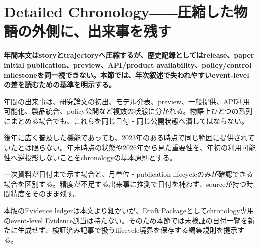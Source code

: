 \section{Detailed Chronology――圧縮した物語の外側に、出来事を残す}
\label{pkg:annual-chronology}
\noindent\textbf{年間本文はstoryとtrajectoryへ圧縮するが、歴史記録としてはrelease、paper initial publication、preview、API/product availability、policy/control milestoneを同一視できない。本節では、年次叙述で失われやすいevent-levelの差を読むための基準を明示する。}

年間の出来事は、研究論文の初出、モデル発表、preview、一般提供、API利用可能化、製品統合、policy公開など複数の状態に分かれる。物語上ひとつの系列にまとめる場合でも、これらを同じ日付・同じ公開状態へ潰してはならない。


後年に広く普及した機能であっても、2023年のある時点で同じ範囲に提供されていたとは限らない。年末時点の状態や2026年から見た重要性を、年初の利用可能性へ逆投影しないことをchronologyの基本原則とする。


一次資料が日付まで示す場合と、月単位・publication lifecycleのみが確認できる場合を区別する。精度が不足する出来事に推測で日付を補わず、sourceが持つ時間精度をそのまま残す。


本版のEvidence ledgerは本文より細かいが、Draft Packageとしてchronology専用のevent-level Evidence割当は持たない。そのため本節では未検証の日付一覧を新たに生成せず、検証済み記事で扱うlifecycle境界を保存する編集規則を提示する。
